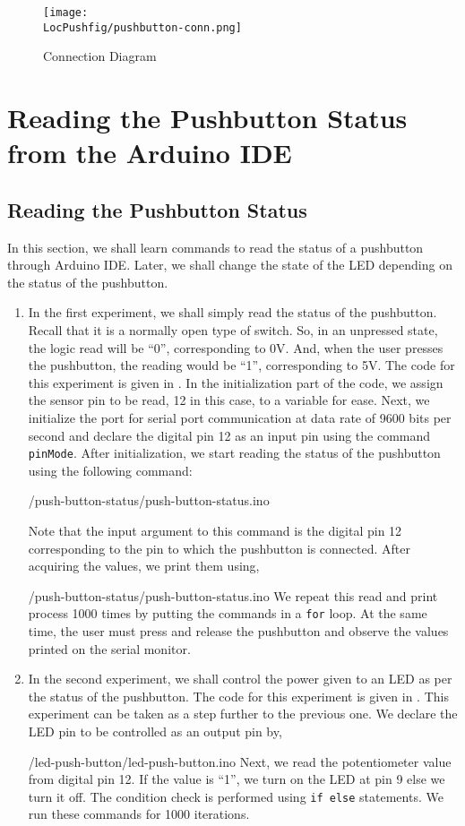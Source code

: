 \begin{figure}
\centering
\texttt{[image: \\LocPushfig/pushbutton-conn.png]}
\caption{Connection Diagram}
\label{fig:pushbuttonconn}
\end{figure}

\section{Reading the Pushbutton Status from the Arduino IDE}
\subsection{Reading the Pushbutton Status}
In this section, we shall learn commands to read the status of a
pushbutton through Arduino IDE. Later, we shall change the state of
the LED depending on the status of the pushbutton. 
\begin{enumerate}
\item In the first experiment, we shall simply read the status of the
  pushbutton. Recall that it is a normally open type of switch. So, in
  an unpressed state, the logic read will be ``0'', corresponding to
  0V. And, when the user presses the pushbutton, the reading would be
  ``1'', corresponding to 5V. The code for this experiment is given in
  . In the initialization part of the code, we
  assign the sensor pin to be read, 12 in this case, to a variable for
  ease. Next, we initialize the port for serial port communication at
  data rate of 9600 bits per second and declare the digital pin 12 as an input pin using the command {\tt pinMode}. After initialization, we start reading the status of the pushbutton using the following command:
  
  {\LocPushardcode/push-button-status/push-button-status.ino}

  Note that the input argument to this command is the digital pin 12
  corresponding to the pin to which the pushbutton is connected.  After
  acquiring the values, we print them using,
  
  {\LocPushardcode/push-button-status/push-button-status.ino} We
  repeat this read and print process 1000 times by putting the
  commands in a {\tt for} loop. At the same time, the user must press
  and release the pushbutton and observe the values printed on the
serial monitor.

\item In the second experiment, we shall control the power given to an
  LED as per the status of the pushbutton. The code for this
  experiment is given in . This experiment can be
  taken as a step further to the previous one. We declare the LED pin
  to be controlled as an output pin by,
  
  {\LocPushardcode/led-push-button/led-push-button.ino} Next, we read
  the potentiometer value from digital pin 12. If the value is ``1'',
  we turn on the LED at pin 9 else we turn it off. The
  condition check is performed using {\tt if else} statements. We run
  these commands for 1000 iterations.
\end{enumerate}

